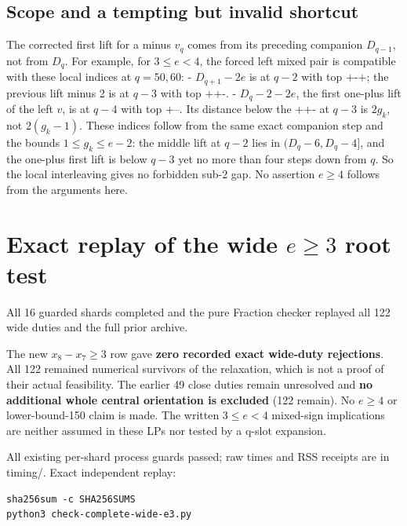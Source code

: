 \documentclass[
  11pt,
]{article}
\begin{document}
\subsection{Scope and a tempting but invalid
shortcut}\label{scope-and-a-tempting-but-invalid-shortcut}

The corrected first lift for a minus \(v_q\) comes from its preceding
companion \(D_{q-1}\), not from \(D_q\). For example, for \(3\le e<4\),
the forced left mixed pair is compatible with these local indices at
\(q=50,60\): - \(D_{q+1}-2e\) is at \(q-2\) with top \(\texttt{+-+}\);
the previous lift minus 2 is at \(q-3\) with top \(\texttt{++-}\). -
\(D_q-2-2e\), the first one-plus lift of the left \(v\), is at \(q-4\)
with top \(\texttt{+--}\). Its distance below the \(\texttt{++-}\) at
\(q-3\) is \(2g_k\), not \(2(g_k-1)\). These indices follow from the
same exact companion step and the bounds \(1\le g_k\le e-2\): the middle
lift at \(q-2\) lies in \((D_q-6,D_q-4]\), and the one-plus first lift
is below \(q-3\) yet no more than four steps down from \(q\). So the
local interleaving gives no forbidden sub-2 gap. No assertion \(e\ge4\)
follows from the arguments here.

\section{\texorpdfstring{Exact replay of the wide \(e\ge3\) root
test}{Exact replay of the wide e\textbackslash ge3 root test}}\label{exact-replay-of-the-wide-ege3-root-test}

All 16 guarded shards completed and the pure Fraction checker replayed
all 122 wide duties and the full prior archive.

The new \(x_8-x_7\ge3\) row gave \textbf{zero recorded exact wide-duty
rejections}. All 122 remained numerical survivors of the relaxation,
which is not a proof of their actual feasibility. The earlier 49 close
duties remain unresolved and \textbf{no additional whole central
orientation is excluded} (122 remain). No \(e\ge4\) or lower-bound-150
claim is made. The written \(3\le e<4\) mixed-sign implications are
neither assumed in these LPs nor tested by a q-slot expansion.

All existing per-shard process guards passed; raw times and RSS receipts
are in timing/. Exact independent replay:

\begin{verbatim}
sha256sum -c SHA256SUMS
python3 check-complete-wide-e3.py
\end{verbatim}
\end{document}
